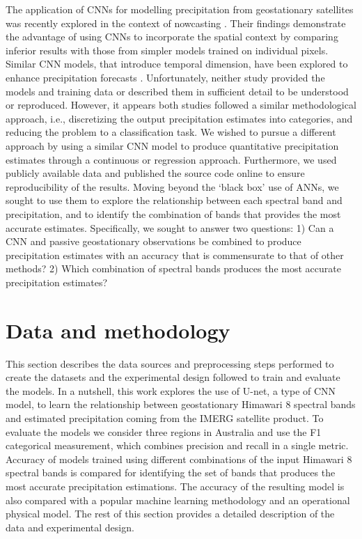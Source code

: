 \documentclass[3p,times]{elsarticle}
\begin{document}
The application of CNNs for modelling precipitation from geostationary satellites was recently explored in the context of nowcasting \citep{lebedev2019precipitation}. Their findings demonstrate the advantage of using CNNs to incorporate the spatial context by comparing inferior results with those from simpler models trained on individual pixels. Similar CNN models, that introduce temporal dimension, have been explored to enhance precipitation forecasts \citep{sonderby2020metnet}. Unfortunately, neither study provided the models and training data or described them in sufficient detail to be understood or reproduced. However, it appears both studies followed a similar methodological approach, i.e., discretizing the output precipitation estimates into categories, and reducing the problem to a classification task. 
We wished to pursue a different approach by using a similar CNN model to produce quantitative precipitation estimates through a continuous or regression approach. Furthermore, we used publicly available data and published the source code online to ensure reproducibility of the results. Moving beyond the ‘black box’ use of ANNs, we sought to use them to explore the relationship between each spectral band and precipitation, and to identify the combination of bands that provides the most accurate estimates. Specifically, we sought to answer two questions: 
1) Can a CNN and passive geostationary observations be combined to produce precipitation estimates with an accuracy that is commensurate to that of other methods?
2) Which combination of spectral bands produces the most accurate precipitation estimates?



\section{Data and methodology}

This section describes the data sources and preprocessing steps performed to create the datasets and the experimental design followed to train and evaluate the models. In a nutshell, this work explores the use of U-net, a type of CNN model, to learn the relationship between geostationary Himawari 8 spectral bands and estimated precipitation coming from the IMERG satellite product. To evaluate the models we consider three regions in Australia and use the F1 categorical measurement, which combines precision and recall in a single metric. Accuracy of models trained using different combinations of the input Himawari 8 spectral bands is compared for identifying the set of bands that produces the most accurate precipitation estimations. The accuracy of the resulting model is also compared with a popular machine learning methodology and an operational physical model. The rest of this section provides a detailed description of the data and experimental design.
\end{document}
